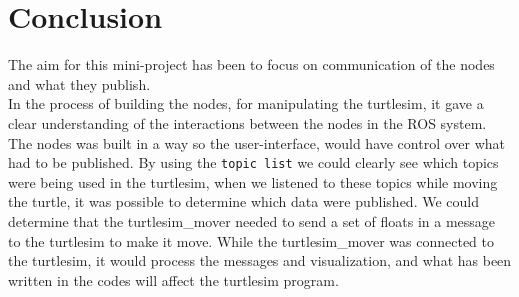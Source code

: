 \chapter{Conclusion}\label{ch:conclusion}


The aim for this mini-project has been to focus on communication of the nodes and what they publish.\\ In the process of building the nodes, for manipulating the turtlesim, it gave a clear understanding of the interactions between the nodes in the ROS system.\\
The nodes was built in a way so the user-interface, would have control over what had to be published. By using the \texttt{topic list} we could clearly see which topics were being used in the turtlesim, when we listened to these topics while moving the turtle, it was possible to determine which data were published. We could determine that the turtlesim\_mover needed to send a set of floats in a message to the turtlesim to make it move. While the turtlesim\_mover was connected to the turtlesim, it would process the messages and visualization, and what has been written in the codes will affect the turtlesim program.\\
